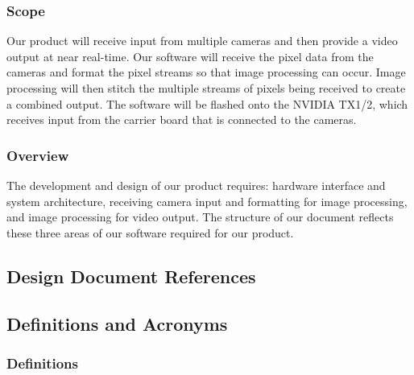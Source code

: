 \documentclass[letterpaper,10pt,serif,draftclsnofoot,onecolumn,compsoc,titlepage]{IEEEtran}
\begin{document}
\subsubsection{Scope}

Our product will receive input from multiple cameras and then provide a video output at 
near real-time. Our software will receive the pixel data from the cameras and format 
the pixel streams so that image processing can occur. Image processing will then stitch 
the multiple streams of pixels being received to create a combined output. The software 
will be flashed onto the NVIDIA TX1/2, which receives input from the carrier 
board that is connected to the cameras. \\

\subsubsection{Overview}

The development and design of our product requires: hardware interface and system 
architecture, receiving camera input and formatting for image processing, and image 
processing for video output. The structure of our document reflects these three areas 
of our software required for our product. \\ 

\newpage
\subsection{Design Document References}




\subsection{Definitions and Acronyms}

\subsubsection{Definitions}
\end{document}
